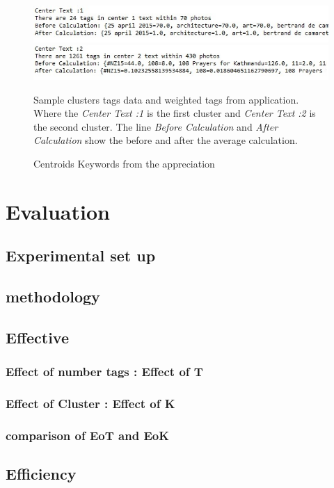 \documentclass[runningheads,a4paper]{llncs}
\begin{document}
\begin{figure}[h]
	\centering
	\includegraphics[width=50cm,bb=0 0 1820 73]{centroid.jpg}
	\includegraphics[width=50cm,bb=0 0 1820 73]{centroid2.jpg}
	\caption{Centroids Keywords from the appreciation}
	{\footnotesize Sample clusters tags data and weighted tags from application. Where the \textit{Center Text :1} is the first cluster and \textit{Center Text :2} is the second cluster. The line \textit{Before Calculation} and \textit{After Calculation} show the before and after the average calculation.}
\end{figure}

\pagebreak


\section{Evaluation} \label{sec-evaluation}
\subsection{Experimental set up}
\subsection{methodology}
\subsection{Effective}
\subsubsection{Effect of number tags : Effect of T}
\subsubsection{Effect of Cluster : Effect of K}
\subsubsection{comparison of EoT and EoK}
\subsection{Efficiency}
\end{document}
